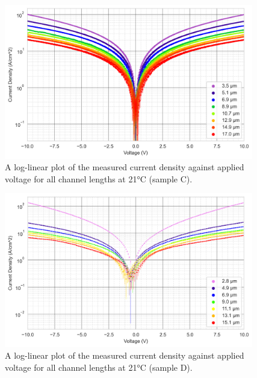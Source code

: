 \begin{refsection}
\begin{figure}[h]
    \centering
    \includegraphics[width=0.97\textwidth]{Sample C 2019/10V_Current_Density_vs_Voltage_Temperature_21_log.png}
    \caption{A log-linear plot of the measured current density against applied voltage for all channel lengths at 21\si{\degreeCelsius} (sample C).}
    \label{fig:10V_current_density_21_C}
\end{figure}
\begin{figure}[h]
    \centering
    \includegraphics[width=0.97\textwidth]{Sample D 2019/10V_Current_Density_vs_Voltage_Temperature_21_log.png}
    \caption{A log-linear plot of the measured current density against applied voltage for all channel lengths at 21\si{\degreeCelsius} (sample D).}
    \label{fig:10V__current_density_21_D}
\end{figure}


\end{refsection}
